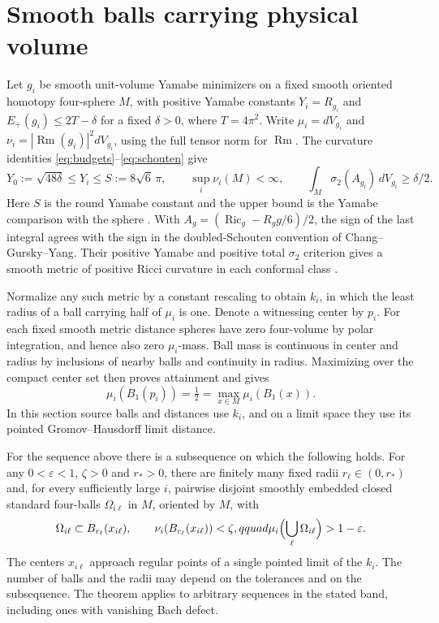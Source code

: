\section{Smooth balls carrying physical volume}
\label{sec:physical-volume}

Let \(g_i\) be smooth unit-volume Yamabe minimizers on a fixed smooth
oriented homotopy four-sphere \(M\), with positive Yamabe constants
\(Y_i=R_{g_i}\) and \(E_+(g_i)\leq 2T-\delta\) for a fixed
\(\delta>0\), where \(T=4\pi^2\). Write \(\mu_i=dV_{g_i}\) and
\(\nu_i=|\operatorname{Rm}(g_i)|^2dV_{g_i}\), using the full tensor
norm for \(\operatorname{Rm}\). The curvature identities
\eqref{eq:budgets}--\eqref{eq:schouten} give
\[
 Y_0:=\sqrt{48\delta}\leq Y_i\leq S:=8\sqrt{6}\,\pi,
 \qquad \sup_i\nu_i(M)<\infty,
 \qquad \int_M\sigma_2(A_{g_i})\,dV_{g_i}\geq\delta/2.
\]
Here \(S\) is the round Yamabe constant and the upper bound is the
Yamabe comparison with the sphere \cite[Theorem~2]{Schoen1984Yamabe}.
With \(A_g=(\operatorname{Ric}_g-R_g g/6)/2\), the sign of the last
integral agrees with the sign in the doubled-Schouten convention of
Chang--Gursky--Yang. Their positive Yamabe and positive total
\(\sigma_2\) criterion gives a smooth metric of positive Ricci curvature
in each conformal class \cite[Theorem~A and Corollary~B]{ChangGurskyYang2002PositiveRicci}.

Normalize any such metric by a constant rescaling to obtain \(k_i\),
in which the least radius of a ball carrying half of \(\mu_i\) is one.
Denote a witnessing center by \(p_i\). For each fixed smooth metric
distance spheres have zero four-volume by polar integration, and
hence also zero \(\mu_i\)-mass. Ball mass is continuous in center and
radius by inclusions of nearby balls and continuity in radius.
Maximizing over the compact center set then proves attainment and
gives
\[
 \mu_i(B_1(p_i))=\tfrac12=\max_{x\in M}\mu_i(B_1(x)).
\]
In this section source balls and distances use \(k_i\), and on a
limit space they use its pointed Gromov--Hausdorff limit distance.

\begin{theorem}
\label{thm:volume-balls}
For the sequence above there is a subsequence on which the following
holds. For any \(0<\varepsilon<1\), \(\zeta>0\) and \(r_*>0\), there
are finitely many fixed radii \(r_\ell\in(0,r_*)\) and, for every
sufficiently large \(i\), pairwise disjoint smoothly embedded closed
standard four-balls \(\Omega_{i\ell}\) in \(M\), oriented by \(M\),
with
\begin{equation}\label{eq:physical-ball-witness}
 \Omega_{i\ell}\subset B_{r_\ell}(x_{i\ell}),\qquad
 \nu_i(B_{r_\ell}(x_{i\ell}))<\zeta,qquad
 \mu_i\Bigl(\bigcup_\ell\Omega_{i\ell}\Bigr)>1-\varepsilon.
\end{equation}
The centers \(x_{i\ell}\) approach regular points of a single pointed
limit of the \(k_i\). The number of balls and the radii may depend on
the tolerances and on the subsequence. The theorem applies to arbitrary
sequences in the stated band, including ones with vanishing Bach defect.
\end{theorem}

